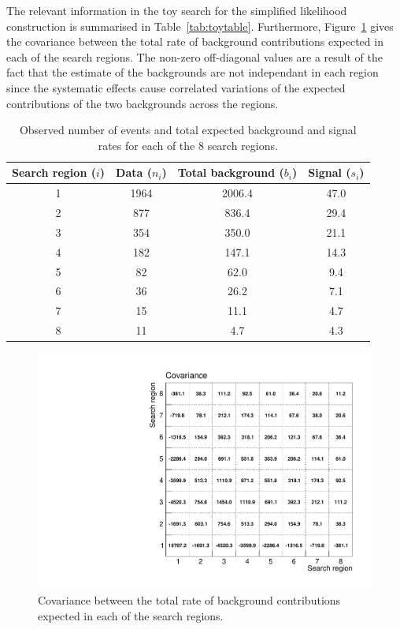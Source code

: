 The relevant information in the toy search for the simplified likelihood construction is summarised in Table~\ref{tab:toytable}.
Furthermore, Figure~\ref{fig:covariance} gives the covariance between the total rate of 
background contributions expected in each of the search regions. The non-zero off-diagonal values are a result of the fact that the estimate of the 
backgrounds are not independant in each region since the systematic effects cause correlated variations of the expected contributions of the two backgrounds 
across the regions. 

\begin{table}[!htb]
\caption{Observed number of events and total expected background and signal rates for each of the 8 search regions.}
 \begin{center}
 \begin{tabular}{|c|c|c|c|}
\hline
Search region ($i$) & Data ($n_{i}$) & Total background ($b_{i}$) & Signal ($s_{i}$) \\
\hline
1 & 1964 & 2006.4 & 47.0 \\
2 & 877 & 836.4 & 29.4 \\
3 & 354 & 350.0 & 21.1 \\
4 & 182 & 147.1 & 14.3 \\
5 & 82  & 62.0  & 9.4 \\
6 & 36  & 26.2  & 7.1 \\
7 & 15  & 11.1  & 4.7 \\
8 & 11  & 4.7   & 4.3 \\
\hline
\end{tabular}
\end{center}
\label{tab:monovtab}
\end{table}

\begin{figure}[hbt]
  \begin{center} 
   \includegraphics[width=1.8\cmsFigWidth]{figures/htsearch_covariance.pdf}
   \caption{Covariance between the total rate of background  contributions expected  in each of the  search regions.}
   \label{fig:covariance} 
  \end{center}
\end{figure}

